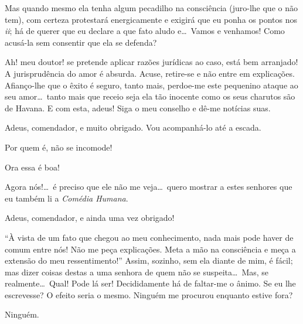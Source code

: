   Mas quando mesmo ela tenha algum pecadilho na
consciência (juro{}-lhe que o não tem), com certeza protestará
energicamente e exigirá que eu ponha os pontos nos \textit{ii}; há de
querer que eu declare a que fato aludo e\ldots\ Vamos e venhamos! Como
acusá{}-la sem consentir que ela se defenda?

 Ah! meu doutor! se pretende aplicar razões
jurídicas ao caso, está bem arranjado! A jurisprudência do amor é
absurda. Acuse, retire{}-se e não entre em explicações. Afianço{}-lhe que o
êxito é seguro, tanto mais, perdoe{}-me este pequenino ataque ao seu
amor\ldots\  tanto mais que receio seja ela tão inocente como os seus
charutos são de Havana.  E com esta, adeus! Siga o meu conselho e dê{}-me
notícias suas. 

   Adeus, comendador,
e muito obrigado. Vou acompanhá{}-lo até a escada.

  Por quem é, não se incomode!

  Ora essa é boa! 

  
Agora nós!\ldots\ é preciso que ele não me veja\ldots\ quero mostrar a estes
senhores que eu também li a \textit{Comédia Humana}. 

  Adeus,
comendador, e ainda uma vez obrigado! 


  ``À vista de um fato que chegou
ao meu conhecimento, nada mais pode haver de comum entre nós! Não me
peça explicações. Meta a mão na consciência e meça a extensão do meu
ressentimento!'' Assim, sozinho, sem ela diante de mim, é
fácil; mas dizer coisas destas a uma senhora de quem não se suspeita\ldots\ 
Mas, se realmente\ldots\ Qual! Pode lá ser! Decididamente há de faltar{}-me o
ânimo. \paren{Com uma ideia.} Se eu lhe escrevesse? O
efeito seria o mesmo.  Ninguém me procurou enquanto estive fora?

  Ninguém.

